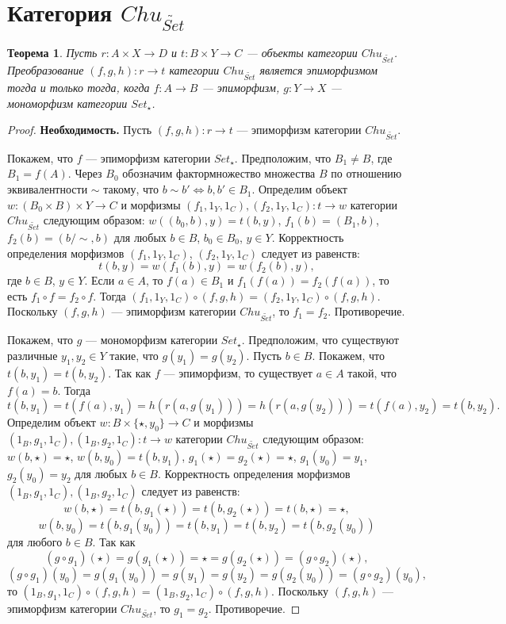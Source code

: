 \documentclass[a4paper,12pt]{article}
\newtheorem{theorem}{Теорема}
\begin{document}
\section*{Категория $Chu_{\widetilde{Set}}$}

\begin{theorem}\label{epimorphism}
    Пусть $r: A \times X \to D$ и $t: B \times Y \to C$ --- объекты категории $Chu_{\widetilde{Set}}$. Преобразование $(f,g,h): r \to t$ категории $Chu_{\widetilde{Set}}$ является эпиморфизмом тогда и только тогда, когда $f: A \to B$ --- эпиморфизм, $g: Y \to X$ --- мономорфизм категории $Set_{\star}$.
\end{theorem}
\begin{proof}
    \textbf{Необходимость.} Пусть $(f,g,h): r \to t$ --- эпиморфизм категории $Chu_{\widetilde{Set}}$.

    Покажем, что $f$ --- эпиморфизм категории $Set_{\star}$. Предположим, что $B_1 \ne B$, где $B_1 = f(A)$. Через $B_0$ обозначим фактормножество множества $B$ по отношению эквивалентности $\sim$ такому, что $b \sim b' \Leftrightarrow b, b' \in B_1$. Определим объект $w: (B_0 \times B) \times Y \to C$ и морфизмы $(f_1,1_Y,1_C), (f_2,1_Y,1_C): t \to w$ категории $Chu_{\widetilde{Set}}$ следующим образом: $w((b_0,b),y) = t(b,y)$, $f_1(b) = (B_1,b)$, $f_2(b) = (b/\sim,b)$ для любых $b \in B$, $b_0 \in B_0$, $y \in Y$. Корректность определения морфизмов $(f_1,1_Y,1_C)$, $(f_2,1_Y,1_C)$ следует из равенств:
    $$
        t(b,y) = w(f_1(b),y) = w(f_2(b),y),
    $$
    где $b \in B$, $y \in Y$. Если $a \in A$, то $f(a) \in B_1$ и $f_1(f(a)) = f_2(f(a))$, то есть $f_1 \circ f = f_2 \circ f$. Тогда $(f_1,1_Y,1_C) \circ (f,g,h) = (f_2,1_Y,1_C) \circ (f,g,h)$. Поскольку $(f,g,h)$ --- эпиморфизм категории $Chu_{\widetilde{Set}}$, то $f_1 = f_2$. Противоречие.

    Покажем, что $g$ --- мономорфизм категории $Set_{\star}$. Предположим, что существуют различные $y_1, y_2 \in Y$ такие, что $g(y_1) = g(y_2)$. Пусть $b \in B$. Покажем, что $t(b,y_1) = t(b,y_2)$. Так как $f$ --- эпиморфизм, то существует $a \in A$ такой, что $f(a) = b$. Тогда
    $$
        t(b,y_1) = t(f(a),y_1) = h(r(a,g(y_1))) = h(r(a,g(y_2))) = t(f(a),y_2) = t(b,y_2).
    $$
    Определим объект $w: B \times \{\star,y_0\} \to C$ и морфизмы $(1_B,g_1,1_C), (1_B,g_2,1_C): t \to w$ категории $Chu_{\widetilde{Set}}$ следующим образом: $w(b,\star) = \star$, $w(b,y_0) = t(b,y_1)$, $g_1(\star) = g_2(\star) = \star$, $g_1(y_0) = y_1$, $g_2(y_0) = y_2$ для любых $b \in B$. Корректность определения морфизмов $(1_B,g_1,1_C), (1_B,g_2,1_C)$ следует из равенств:
    $$
        w(b,\star) = t(b,g_1(\star)) = t(b,g_2(\star)) = t(b,\star) = \star,
    $$
    $$
        w(b,y_0) = t(b,g_1(y_0)) = t(b,y_1) = t(b,y_2) = t(b,g_2(y_0))
    $$
    для любого $b \in B$. Так как
    $$
        (g \circ g_1)(\star) = g(g_1(\star)) = \star = g(g_2(\star)) = (g \circ g_2)(\star),
    $$
    $$
        (g \circ g_1)(y_0) = g(g_1(y_0)) = g(y_1) = g(y_2) = g(g_2(y_0)) = (g \circ g_2)(y_0),
    $$
    то $(1_B,g_1,1_C) \circ (f,g,h) = (1_B,g_2,1_C) \circ (f,g,h)$. Поскольку $(f,g,h)$ --- эпиморфизм категории $Chu_{\widetilde{Set}}$, то $g_1 = g_2$. Противоречие.


\end{proof}
\end{document}
